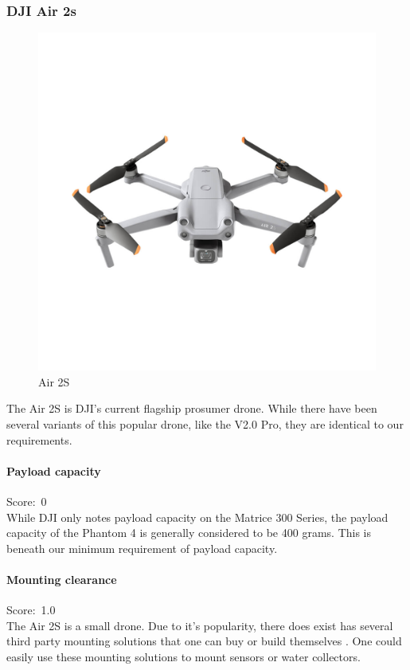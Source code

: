 \newpage
\subsubsection{DJI Air 2s}
\begin{figure}
\includegraphics[width=1\linewidth]{uav/models/51_air2s.jpg}
\caption{Air 2S}
\end{figure}
The Air 2S \cite{phantom4} is DJI's current flagship prosumer drone. While there have been several variants of this popular drone, like the V2.0 Pro, they are identical to our requirements.

\paragraph{Payload capacity}\mbox{Score: 0} \\
While DJI only notes payload capacity on the Matrice 300 Series, the payload capacity of the Phantom 4 is generally considered to be 400 grams. \cite{air2spayloadrelease} This is beneath our minimum requirement of payload capacity.

\paragraph{Mounting clearance}\mbox{Score: 1.0} \\
The Air 2S is a small drone. Due to it's popularity, there does exist  has several third party mounting solutions that one can buy \cite{air2spayloadrelease} or build themselves \cite{thingiverseair}. One could easily use these mounting solutions to mount sensors or water collectors.

